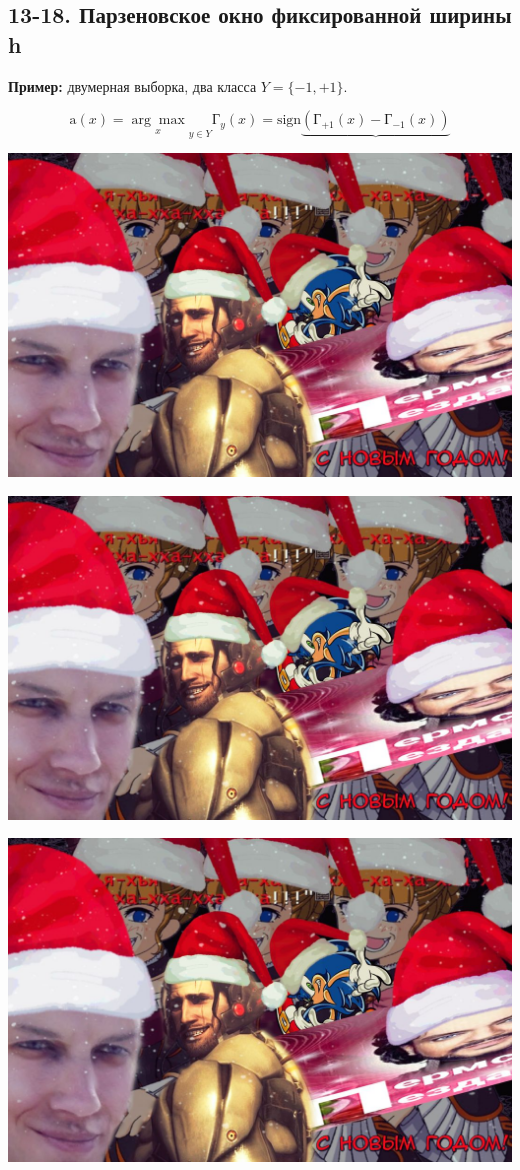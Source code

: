 \subsection{13-18. Парзеновское окно фиксированной ширины h}

\textbf{Пример:} двумерная выборка, два класса $Y = \lbrace -1, +1 \rbrace$.

$$\text{a}(x) = {\underset{x}{\arg\max}}_{y \in Y} Г_y(x) = \text{sign}
\underbrace{\left( Г_{+1}(x) - Г_{-1}(x) \right)}$$

\includegraphics[scale=0.3]{figures/samplefigure.jpg}

\includegraphics[scale=0.3]{figures/samplefigure.jpg}

\includegraphics[scale=0.3]{figures/samplefigure.jpg}

